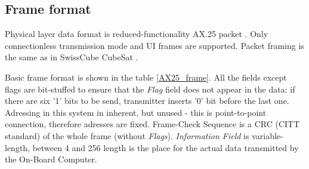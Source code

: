
\subsection{Frame format}
Physical layer data format is reduced-functionality AX.25 packet \cite{AX25_standard}. Only connectionless transmission mode and UI frames are supported. Packet framing is the same as in SwissCube CubeSat \cite{SwissCube_AX25}.

Basic frame format is shown in the table \ref{AX25_frame}. All the fields except flags are bit-stuffed to ensure that the \textit{Flag} field does not appear in the data: if there are six '1' bits to be send, transmitter inserts '0' bit before the last one. Adressing in this system in inherent, but unused - this is point-to-point connection, therefore adresses are fixed. Frame-Check Sequence is a CRC (CITT standard) of the whole frame (without \textit{Flags}). \textit{Information Field} is variable-length, between \si{4} and \SI{256}{\byte} length is the place for the actual data transmitted by the On-Board Computer.

